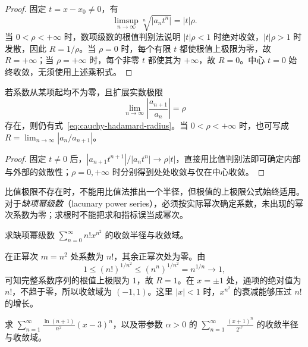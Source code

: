 \documentclass[UTF8,12pt,a4paper,fontset=fandol]{ctexbook}
\begin{document}
\begin{proof}
固定 $t=x-x_0\neq0$，有
\[
    \limsup_{n\to\infty}\sqrt[n]{|a_nt^n|}=|t|\rho.
\]
当 $0<\rho<+\infty$ 时，数项级数的根值判别法说明 $|t|\rho<1$ 时绝对收敛，$|t|\rho>1$ 时发散，因此 $R=1/\rho$。当 $\rho=0$ 时，每个有限 $t$ 都使根值上极限为零，故 $R=+\infty$；当 $\rho=+\infty$ 时，每个非零 $t$ 都使其为 $+\infty$，故 $R=0$。中心 $t=0$ 始终收敛，无须使用上述乘积式。
\end{proof}

\begin{corollary}[比值法]
\label{cor:power-series-ratio-radius}
若系数从某项起均不为零，且扩展实数极限
\[
    \lim_{n\to\infty}\left|\frac{a_{n+1}}{a_n}\right|=\rho
\]
存在，则仍有式~\eqref{eq:cauchy-hadamard-radius}。当 $0<\rho<+\infty$ 时，也可写成 $R=\lim_{n\to\infty}|a_n/a_{n+1}|$。
\end{corollary}

\begin{proof}
固定 $t\neq0$ 后，$|a_{n+1}t^{n+1}|/|a_nt^n|\to\rho|t|$，直接用比值判别法即可确定内部与外部的敛散性；$\rho=0,+\infty$ 时分别得到处处收敛与仅在中心收敛。
\end{proof}

比值极限不存在时，不能用比值法推出一个半径，但根值的上极限公式始终适用。对于\emph{缺项幂级数}（lacunary power series），必须按实际幂次确定系数，未出现的幂次系数为零；求根时不能把求和指标误当成幂次。

\begin{example}
\label{ex:lacunary-factorial-power-series}
求缺项幂级数 $\displaystyle\sum_{n=0}^\infty n!x^{n^2}$ 的收敛半径与收敛域。
\end{example}

\begin{solve}
在正幂次 $m=n^2$ 处系数为 $n!$，其余正幂次处为零。由
\[
    1\leq(n!)^{1/n^2}\leq(n^n)^{1/n^2}
    =n^{1/n}\longrightarrow1,
\]
可知完整系数序列的根值上极限为 $1$，故 $R=1$。在 $x=\pm1$ 处，通项的绝对值为 $n!$，不趋于零，所以收敛域为 $(-1,1)$。这里 $|x|<1$ 时，$x^{n^2}$ 的衰减能够压过 $n!$ 的增长。
\end{solve}

\begin{example}
\label{ex:shifted-and-parameter-power-series}
求 $\displaystyle\sum_{n=1}^\infty\frac{\ln(n+1)}{n^2}(x-3)^n$，以及带参数 $\alpha>0$ 的 $\displaystyle\sum_{n=1}^\infty\frac{(x+1)^n}{2^{n^\alpha}}$ 的收敛半径与收敛域。
\end{example}
\end{document}
